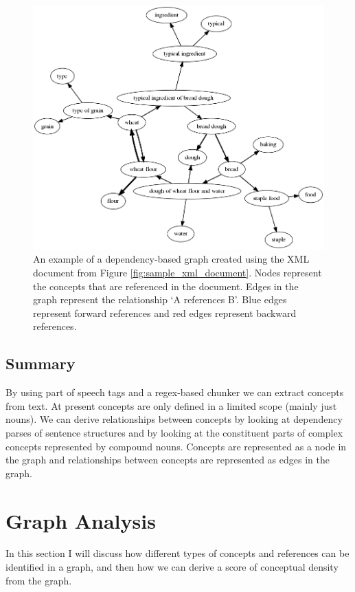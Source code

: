\documentclass[12pt]{article}
\begin{document}
\begin{figure}
    \centering
    \includegraphics[width=\linewidth]{reports/technical_report/latex/figures/bread_graph-sections_only-implicit_references.png}
    \caption{An example of a dependency-based graph created using the XML document from Figure \ref{fig:sample_xml_document}. Nodes represent the concepts that are referenced in the document. Edges in the graph represent the relationship `A references B'. Blue edges represent forward references and red edges represent backward references.}
    \label{fig:graph_example}
\end{figure}

\subsection{Summary}
By using part of speech tags and a regex-based chunker we can extract concepts from text. At present concepts are only defined in a limited scope (mainly just nouns). We can derive relationships between concepts by looking at dependency parses of sentence structures and by looking at the constituent parts of complex concepts represented by compound nouns. Concepts are represented as a node in the graph and relationships between concepts are represented as edges in the graph.

\section{Graph Analysis} \label{sec:graph analysis}
In this section I will discuss how different types of concepts and references can be identified in a graph, and then how we can derive a score of conceptual density from the graph.
\end{document}
